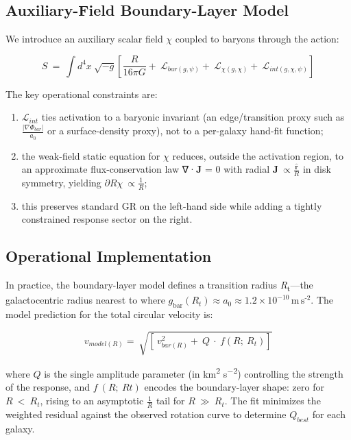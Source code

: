 \documentclass[11pt]{article}
\begin{document}
\subsection{Auxiliary-Field Boundary-Layer Model}\label{auxiliary-field-boundary-layer-model}

We introduce an auxiliary scalar field \(\chi\) coupled to baryons through the action: \citep{Burgess2004EFTGR, Donoghue1994EFTGR}

\[S\  = \ \int d^{4}x\ \sqrt{- g}\left\lbrack \frac{R}{16\pi G} + \ \mathcal{L}_{bar(g,\psi)} + \ \mathcal{L}_{\chi(g,\chi)} + \ \mathcal{L}_{int(g,\chi,\psi)} \right\rbrack\]

The key operational constraints are:

\begin{enumerate}
\def\labelenumi{(\roman{enumi})}
\item
  \(\mathcal{L}_{int}\) ties activation to a baryonic invariant (an edge/transition proxy such as \(\frac{\left| \nabla\Phi_{bar} \right|}{a_{0}}\) or a surface-density proxy), not to a per-galaxy hand-fit function;
\item
  the weak-field static equation for \(\chi\) reduces, outside the activation region, to an approximate flux-conservation law \citep{BenderOrszag1999, KevorkianCole1996} ∇·\textbf{J} = 0 with radial \(\mathbf{J}\  \propto \frac{\widehat{\mathbf{r}}}{R}\) in disk symmetry, yielding \(\partial R\chi\  \propto \frac{1}{R}\);
\item
  this preserves standard GR on the left-hand side while adding a tightly constrained response sector on the right.
\end{enumerate}

\subsection{Operational Implementation}\label{operational-implementation}

In practice, the boundary-layer model defines a transition radius \emph{R}\textsubscript{t}---the galactocentric radius nearest to where \(g_{\text{bar}}\left( R_{t} \right) \approx a_{0} \approx 1.2 \times 10^{- 10}\,\text{m}\,\text{s}^{\text{-2}}\). The model prediction for the total circular velocity is:

\[v_{model(R)} = \ \sqrt{\left\lbrack \ v_{bar(R)}^{2} + \ Q\  \cdot \ f\left( R;\ R_{t} \right) \right\rbrack}\]

where \(Q\) is the single amplitude parameter (in km\textsuperscript{2} s\textsuperscript{−2}) controlling the strength of the response, and \(f\ (R;\ Rt)\) encodes the boundary-layer shape: zero for \(R\  < \ R_{t}\), rising to an asymptotic \(\frac{1}{R}\) tail for \(R\  \gg \ R_{t}\). The fit minimizes the weighted residual against the observed rotation curve to determine \(Q_{best}\) for each galaxy.
\end{document}
